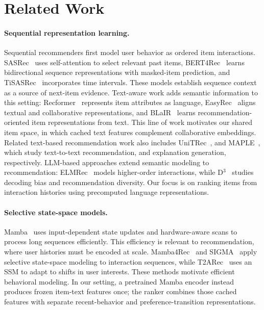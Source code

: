 \documentclass[11pt]{article}
\begin{document}
\section{Related Work}
\paragraph{Sequential representation learning.}
Sequential recommenders first model user behavior as ordered item interactions. SASRec~\citep{SASRec} uses self-attention to select relevant past items, BERT4Rec~\citep{BERT4Rec} learns bidirectional sequence representations with masked-item prediction, and TiSASRec~\citep{TiSASRec} incorporates time intervals. These models establish sequence context as a source of next-item evidence. Text-aware work adds semantic information to this setting: Recformer~\citep{Recformer} represents item attributes as language, EasyRec~\citep{EasyRec} aligns textual and collaborative representations, and BLaIR~\citep{BLaIR} learns recommendation-oriented item representations from text. This line of work motivates our shared item space, in which cached text features complement collaborative embeddings. Related text-based recommendation work also includes UniTRec~\citep{UnitRec}, and MAPLE~\citep{MAPLE}, which study text-to-text recommendation, and explanation generation, respectively. LLM-based approaches extend semantic modeling to recommendation: ELMRec~\citep{ELMRec} models higher-order interactions, while D$^3$~\citep{D3} studies decoding bias and recommendation diversity. Our focus is on ranking items from interaction histories using precomputed language representations.

\paragraph{Selective state-space models.}
Mamba~\citep{Mamba} uses input-dependent state updates and hardware-aware scans to process long sequences efficiently. This efficiency is relevant to recommendation, where user histories must be encoded at scale. Mamba4Rec~\citep{Mamba4Rec} and SIGMA~\citep{SIGMA} apply selective state-space modeling to interaction sequences, while T2ARec~\citep{T2ARec} uses an SSM to adapt to shifts in user interests. These methods motivate efficient behavioral modeling. In our setting, a pretrained Mamba encoder instead produces frozen item-text features once; the ranker combines those cached features with separate recent-behavior and preference-transition representations.
\end{document}
